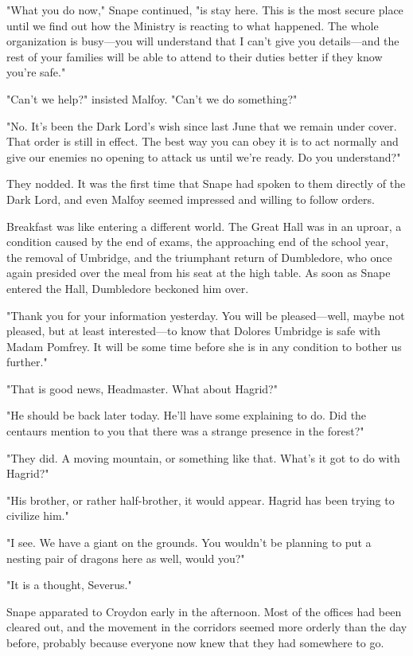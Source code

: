 "What you do now," Snape continued, "is stay here. This is the most secure place until we find out how the Ministry is reacting to what happened. The whole organization is{\el} busy—you will understand that I can't give you details—and the rest of your families will be able to attend to their duties better if they know you're safe."

"Can't we help?" insisted Malfoy. "Can't we do something?"

"No. It's been the Dark Lord's wish since last June that we remain under cover. That order is still in effect. The best way you can obey it is to act normally and give our enemies no opening to attack us until we're ready. Do you understand?"

They nodded. It was the first time that Snape had spoken to them directly of the Dark Lord, and even Malfoy seemed impressed and willing to follow orders.

Breakfast was like entering a different world. The Great Hall was in an uproar, a condition caused by the end of exams, the approaching end of the school year, the removal of Umbridge, and the triumphant return of Dumbledore, who once again presided over the meal from his seat at the high table. As soon as Snape entered the Hall, Dumbledore beckoned him over.

"Thank you for your information yesterday. You will be pleased—well, maybe not pleased, but at least interested—to know that Dolores Umbridge is safe with Madam Pomfrey. It will be some time before she is in any condition to bother us further."

"That is good news, Headmaster. What about Hagrid?"

"He should be back later today. He'll have some explaining to do. Did the centaurs mention to you that there was a strange presence in the forest?"

"They did. A moving mountain, or something like that. What's it got to do with Hagrid?"

"His brother, or rather half-brother, it would appear. Hagrid has been trying to civilize him."

"I see. We have a giant on the grounds. You wouldn't be planning to put a nesting pair of dragons here as well, would you?"

"It is a thought, Severus."

Snape apparated to Croydon early in the afternoon. Most of the offices had been cleared out, and the movement in the corridors seemed more orderly than the day before, probably because everyone now knew that they had somewhere to go.

